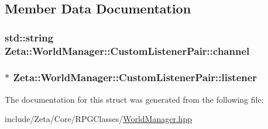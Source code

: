 \subsection{Member Data Documentation}
\hypertarget{structZeta_1_1WorldManager_1_1CustomListenerPair_a73f8c370312bd98d15e9a14a6ef19639}{
\subsubsection[{channel}]{\setlength{\rightskip}{0pt plus 5cm}std\+::string Zeta\+::\+World\+Manager\+::\+Custom\+Listener\+Pair\+::channel}}\label{structZeta_1_1WorldManager_1_1CustomListenerPair_a73f8c370312bd98d15e9a14a6ef19639}
\hypertarget{structZeta_1_1WorldManager_1_1CustomListenerPair_ab919df922f917c625f063c4e91d23890}{
\subsubsection[{listener}]{$\ast$ Zeta\+::\+World\+Manager\+::\+Custom\+Listener\+Pair\+::listener}}\label{structZeta_1_1WorldManager_1_1CustomListenerPair_ab919df922f917c625f063c4e91d23890}


The documentation for this struct was generated from the following file\+:\begin{DoxyCompactItemize}
\item 
include/\+Zeta/\+Core/\+R\+P\+G\+Classes/\hyperlink{WorldManager_8hpp}{World\+Manager.\+hpp}\end{DoxyCompactItemize}

